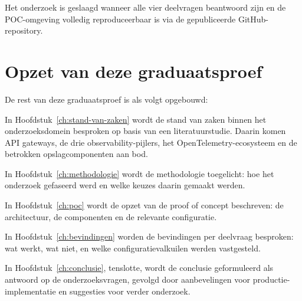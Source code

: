 Het onderzoek is geslaagd wanneer alle vier deelvragen beantwoord zijn en de POC-omgeving volledig reproduceerbaar is via de gepubliceerde GitHub-repository.

\section{Opzet van deze graduaatsproef}%
\label{sec:opzet-graduaatsproef}

De rest van deze graduaatsproef is als volgt opgebouwd:

In Hoofdstuk~\ref{ch:stand-van-zaken} wordt de stand van zaken binnen het onderzoeksdomein besproken op basis van een literatuurstudie. Daarin komen API gateways, de drie observability-pijlers, het OpenTelemetry-ecosysteem en de betrokken opslagcomponenten aan bod.

In Hoofdstuk~\ref{ch:methodologie} wordt de methodologie toegelicht: hoe het onderzoek gefaseerd werd en welke keuzes daarin gemaakt werden.

In Hoofdstuk~\ref{ch:poc} wordt de opzet van de proof of concept beschreven: de architectuur, de componenten en de relevante configuratie.

In Hoofdstuk~\ref{ch:bevindingen} worden de bevindingen per deelvraag besproken: wat werkt, wat niet, en welke configuratievalkuilen werden vastgesteld.

In Hoofdstuk~\ref{ch:conclusie}, tenslotte, wordt de conclusie geformuleerd als antwoord op de onderzoeksvragen, gevolgd door aanbevelingen voor productie-implementatie en suggesties voor verder onderzoek.